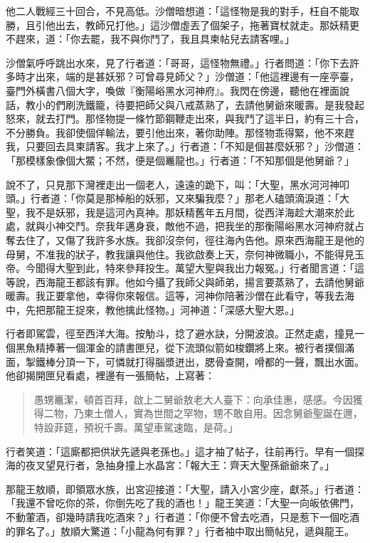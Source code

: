 他二人戰經三十回合，不見高低。沙僧暗想道：「這怪物是我的對手，枉自不能取勝，且引他出去，教師兄打他。」這沙僧虛丟了個架子，拖著寶杖就走。那妖精更不趕來，道：「你去罷，我不與你鬥了，我且具柬帖兒去請客哩。」

沙僧氣呼呼跳出水來，見了行者道：「哥哥，這怪物無禮。」行者問道：「你下去許多時才出來，端的是甚妖邪？可曾尋見師父？」沙僧道：「他這裡邊有一座亭臺，臺門外橫書八個大字，喚做『衡陽峪黑水河神府』。我閃在傍邊，聽他在裡面說話，教小的們刷洗鐵籠，待要把師父與八戒蒸熟了，去請他舅爺來暖壽。是我發起怒來，就去打門。那怪物提一條竹節鋼鞭走出來，與我鬥了這半日，約有三十合，不分勝負。我卻使個佯輸法，要引他出來，著你助陣。那怪物乖得緊，他不來趕我，只要回去具柬請客。我才上來了。」行者道：「不知是個甚麼妖邪？」沙僧道：「那模樣象像個大鱉；不然，便是個鼉龍也。」行者道：「不知那個是他舅爺？」

說不了，只見那下灣裡走出一個老人，遠遠的跪下，叫：「大聖，黑水河河神叩頭。」行者道：「你莫是那棹船的妖邪，又來騙我麼？」那老人磕頭滴淚道：「大聖，我不是妖邪，我是這河內真神。那妖精舊年五月間，從西洋海趁大潮來於此處，就與小神交鬥。奈我年邁身衰，敵他不過，把我坐的那衡陽峪黑水河神府就占奪去住了，又傷了我許多水族。我卻沒奈何，徑往海內告他。原來西海龍王是他的母舅，不准我的狀子，教我讓與他住。我欲啟奏上天，奈何神微職小，不能得見玉帝。今聞得大聖到此，特來參拜投生。萬望大聖與我出力報冤。」行者聞言道：「這等說，西海龍王都該有罪。他如今攝了我師父與師弟，揚言要蒸熟了，去請他舅爺暖壽。我正要拿他，幸得你來報信。這等，河神你陪著沙僧在此看守，等我去海中，先把那龍王捉來，教他擒此怪物。」河神道：「深感大聖大恩。」

行者即駕雲，徑至西洋大海。按觔斗，捻了避水訣，分開波浪。正然走處，撞見一個黑魚精捧著一個渾金的請書匣兒，從下流頭似箭如梭鑽將上來。被行者撲個滿面，掣鐵棒分頂一下，可憐就打得腦漿迸出，腮骨查開，嗗都的一聲，飄出水面。他卻揭開匣兒看處，裡邊有一張簡帖，上寫著：
\begin{quote}
愚甥鼉潔，頓首百拜，啟上二舅爺敖老大人臺下：向承佳惠，感感。今因獲得二物，乃東土僧人，實為世間之罕物，甥不敢自用。因念舅爺聖誕在邇，特設菲筵，預祝千壽。萬望車駕速臨，是荷。」
\end{quote}

行者笑道：「這廝都把供狀先遞與老孫也。」這才袖了帖子，往前再行。早有一個探海的夜叉望見行者，急抽身撞上水晶宮：「報大王：齊天大聖孫爺爺來了。」

那龍王敖順，即領眾水族，出宮迎接道：「大聖，請入小宮少座，獻茶。」行者道：「我還不曾吃你的茶，你倒先吃了我的酒也！」龍王笑道：「大聖一向皈依佛門，不動葷酒，卻幾時請我吃酒來？」行者道：「你便不曾去吃酒，只是惹下一個吃酒的罪名了。」敖順大驚道：「小龍為何有罪？」行者袖中取出簡帖兒，遞與龍王。

